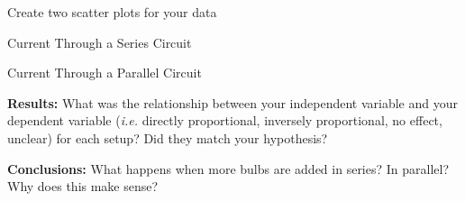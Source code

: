 \documentclass[10pt]{exam}
\begin{document}
\begin{questions}
\begin{multicols}{2}
    \end{multicols}

\question
  Create two scatter plots for your data


    \begin{multicols}{2}
      Current Through a Series Circuit


      Current Through a Parallel Circuit


    \end{multicols}
                 
\question
  \textbf{Results:} What was the relationship between your independent variable and your dependent variable (\emph{i.e.} directly proportional, inversely proportional, no effect, unclear) for each setup?  Did they match your hypothesis?
  \vs

\question
  \textbf{Conclusions:}  What happens when more bulbs are added in series?  In parallel?  Why does this make sense?
  \vs

  
\end{questions}
\end{document}
